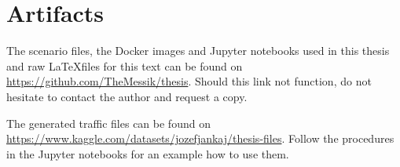 \section{Artifacts}

The scenario files, the Docker images and Jupyter notebooks used in this thesis and raw \LaTeX files for this text can be found on \url{https://github.com/TheMessik/thesis}. Should this link not function, do not hesitate to contact the author and request a copy.

The generated traffic files can be found on \url{https://www.kaggle.com/datasets/jozefjankaj/thesis-files}. Follow the procedures in the Jupyter notebooks for an example how to use them.